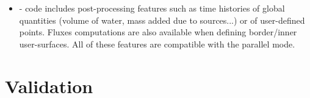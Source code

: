 \begin{list}{-}{}
\begin {itemize}
    \item [-] \estel code includes post-processing features such as time histories of global quantities (volume of water, mass added due to sources...) or of user-defined points. Fluxes computations are also available when defining border/inner user-surfaces. All of these features are compatible with the parallel mode.
  \end{itemize}
%
%
\vspace{5pt}
%
\end {list} 
% 
\clearpage
\section{Validation}
%
